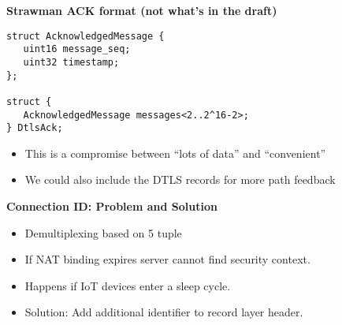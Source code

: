 \documentclass[helvetica]{seminar}
\newcommand{\heading}[1]{%
  \begin{center} 
    \large\bf 
    #1 
  \end{center} 
  \vspace{.4 in}}
\begin{document}
\begin{slide}
\heading{Strawman ACK format (not what's in the draft)}

{\small
\begin{verbatim}
struct AcknowledgedMessage {
   uint16 message_seq;
   uint32 timestamp; 
};

struct {
   AcknowledgedMessage messages<2..2^16-2>;
} DtlsAck;
\end{verbatim}
}

\begin{itemize}
\item This is a compromise between ``lots of data'' and ``convenient''
\item We could also include the DTLS records for more path feedback
\end{itemize}

\end{slide}


\begin{slide}
\heading{Connection ID: Problem and Solution}
\begin{itemize} 
\item Demultiplexing based on 5 tuple
\item If NAT binding expires server cannot find security context.
\item Happens if IoT devices enter a sleep cycle.
\item Solution: Add additional identifier to record layer header.
\end{itemize}
\end{slide}
\end{document}

